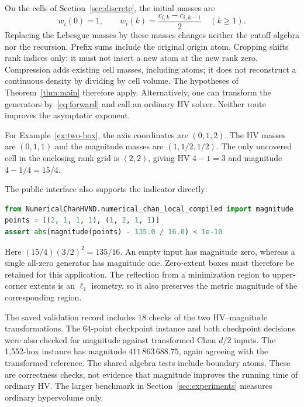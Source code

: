 On the cells of Section~\ref{sec:discrete}, the initial masses are
\[
 w_i(0)=1,\qquad w_i(k)=\frac{c_{i,k}-c_{i,k-1}}2\quad(k\ge1).
\]
Replacing the Lebesgue masses by these masses changes neither the cutoff
algebra nor the recursion. Prefix sums include the original origin atom.
Cropping shifts rank indices only: it must not insert a new atom at the
new rank zero. Compression adds existing cell masses, including atoms;
it does not reconstruct a continuous density by dividing by cell volume.
The hypotheses of Theorem~\ref{thm:main} therefore apply. Alternatively,
one can transform the generators by~\eqref{eq:forward} and call an ordinary
HV solver. Neither route improves the asymptotic exponent.

For Example~\ref{ex:two-box}, the axis coordinates are $(0,1,2)$.
The HV masses are $(0,1,1)$ and the magnitude masses are $(1,1/2,1/2)$.
The only uncovered cell in the enclosing rank grid is $(2,2)$, giving
HV $4-1=3$ and magnitude $4-1/4=15/4$.

The public interface also supports the indicator directly:
\begin{lstlisting}[language=Python]
from NumericalChanHVND.numerical_chan_local_compiled import magnitude
points = [(2, 1, 1, 1), (1, 2, 1, 1)]
assert abs(magnitude(points) - 135.0 / 16.0) < 1e-10
\end{lstlisting}
Here $(15/4)(3/2)^2=135/16$. An empty input has magnitude zero, whereas
a single all-zero generator has magnitude one. Zero-extent boxes must
therefore be retained for this application. The reflection from a
minimization region to upper-corner extents is an $\ell_1$ isometry, so
it also preserves the metric magnitude of the corresponding region.

The saved validation record includes 18 checks of the two HV--magnitude
transformations. The 64-point checkpoint instance and both checkpoint
decisions were also checked for magnitude against transformed Chan $d/2$
inputs. The 1,552-box instance has magnitude $411\,863\,688.75$, again
agreeing with the transformed reference. The shared algebra tests include
boundary atoms. These are correctness checks, not evidence that magnitude
improves the running time of ordinary HV. The larger benchmark in
Section~\ref{sec:experiments} measures ordinary hypervolume only.
